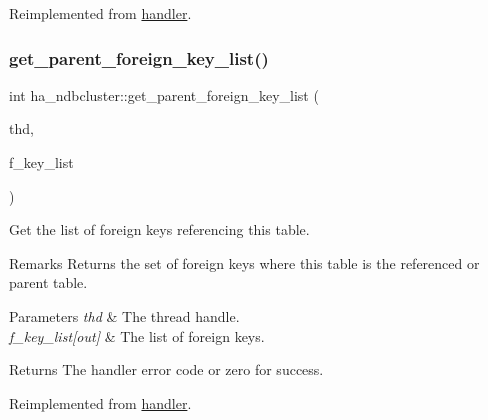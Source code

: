 Reimplemented from \mbox{\hyperlink{classhandler_a81064e61d4c08261af409fb6ee34e3ca}{handler}}.

\mbox{\label{classha__ndbcluster_a8ef2926a38b2b39387ad40c55708faa2}} 
\subsubsection{\texorpdfstring{get\+\_\+parent\+\_\+foreign\+\_\+key\+\_\+list()}{get\_parent\_foreign\_key\_list()}}
{\footnotesize\ttfamily int ha\+\_\+ndbcluster\+::get\+\_\+parent\+\_\+foreign\+\_\+key\+\_\+list (\begin{DoxyParamCaption}\item[{T\+HD $\ast$}]{thd,  }\item[{\mbox{\hyperlink{classList}{List}}$<$ \mbox{\hyperlink{structst__foreign__key__info}{F\+O\+R\+E\+I\+G\+N\+\_\+\+K\+E\+Y\+\_\+\+I\+N\+FO}} $>$ $\ast$}]{f\+\_\+key\+\_\+list }\end{DoxyParamCaption})\hspace{0.3cm}{\ttfamily [virtual]}}

Get the list of foreign keys referencing this table.

\begin{DoxyRemark}{Remarks}
Returns the set of foreign keys where this table is the referenced or parent table.
\end{DoxyRemark}

\begin{DoxyParams}{Parameters}
{\em thd} & The thread handle. \\
\hline
{\em f\+\_\+key\+\_\+list\mbox{[}out\mbox{]}} & The list of foreign keys.\\
\hline
\end{DoxyParams}
\begin{DoxyReturn}{Returns}
The handler error code or zero for success. 
\end{DoxyReturn}


Reimplemented from \mbox{\hyperlink{classhandler_a9187eea9999eba802ee4ae01f91dda3b}{handler}}.

\mbox{\label{classha__ndbcluster_a1d3598345c3543f684c566f79a61cedc}} 
